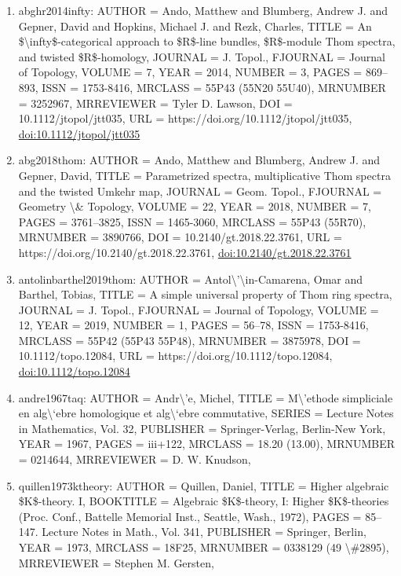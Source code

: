 \documentclass[11pt]{article}
\begin{document}
\begin{enumerate}[leftmargin=*]
  \item abghr2014infty: AUTHOR = Ando, Matthew and Blumberg, Andrew J. and Gepner, David and Hopkins, Michael J. and Rezk, Charles, TITLE = An \$\textbackslash{}infty\$-categorical approach to \$R\$-line bundles, \$R\$-module Thom spectra, and twisted \$R\$-homology, JOURNAL = J. Topol., FJOURNAL = Journal of Topology, VOLUME = 7, YEAR = 2014, NUMBER = 3, PAGES = 869--893, ISSN = 1753-8416, MRCLASS = 55P43 (55N20 55U40), MRNUMBER = 3252967, MRREVIEWER = Tyler D. Lawson, DOI = 10.1112/jtopol/jtt035, URL = https://doi.org/10.1112/jtopol/jtt035, \href{https://doi.org/10.1112/jtopol/jtt035}{doi:10.1112/jtopol/jtt035}
  \item abg2018thom: AUTHOR = Ando, Matthew and Blumberg, Andrew J. and Gepner, David, TITLE = Parametrized spectra, multiplicative Thom spectra and the twisted Umkehr map, JOURNAL = Geom. Topol., FJOURNAL = Geometry \textbackslash{}\& Topology, VOLUME = 22, YEAR = 2018, NUMBER = 7, PAGES = 3761--3825, ISSN = 1465-3060, MRCLASS = 55P43 (55R70), MRNUMBER = 3890766, DOI = 10.2140/gt.2018.22.3761, URL = https://doi.org/10.2140/gt.2018.22.3761, \href{https://doi.org/10.2140/gt.2018.22.3761}{doi:10.2140/gt.2018.22.3761}
  \item antolinbarthel2019thom: AUTHOR = Antol\textbackslash{}'\textbackslash{}in-Camarena, Omar and Barthel, Tobias, TITLE = A simple universal property of Thom ring spectra, JOURNAL = J. Topol., FJOURNAL = Journal of Topology, VOLUME = 12, YEAR = 2019, NUMBER = 1, PAGES = 56--78, ISSN = 1753-8416, MRCLASS = 55P42 (55P43 55P48), MRNUMBER = 3875978, DOI = 10.1112/topo.12084, URL = https://doi.org/10.1112/topo.12084, \href{https://doi.org/10.1112/topo.12084}{doi:10.1112/topo.12084}
  \item andre1967taq: AUTHOR = Andr\textbackslash{}'e, Michel, TITLE = M\textbackslash{}'ethode simpliciale en alg\textbackslash{}`ebre homologique et alg\textbackslash{}`ebre commutative, SERIES = Lecture Notes in Mathematics, Vol. 32, PUBLISHER = Springer-Verlag, Berlin-New York, YEAR = 1967, PAGES = iii+122, MRCLASS = 18.20 (13.00), MRNUMBER = 0214644, MRREVIEWER = D. W. Knudson,
  \item quillen1973ktheory: AUTHOR = Quillen, Daniel, TITLE = Higher algebraic \$K\$-theory. I, BOOKTITLE = Algebraic \$K\$-theory, I: Higher \$K\$-theories (Proc. Conf., Battelle Memorial Inst., Seattle, Wash., 1972), PAGES = 85--147. Lecture Notes in Math., Vol. 341, PUBLISHER = Springer, Berlin, YEAR = 1973, MRCLASS = 18F25, MRNUMBER = 0338129 (49 \textbackslash{}\#2895), MRREVIEWER = Stephen M. Gersten,

\end{enumerate}
\end{document}
